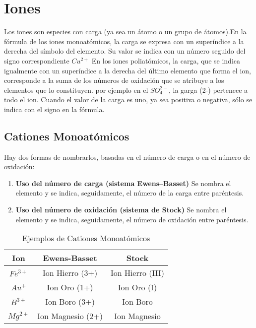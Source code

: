 \section{Iones}
Los iones son especies con carga (ya sea un átomo o un grupo de átomos).En la fórmula de los iones monoatómicos, la carga se expresa con un superíndice a la derecha del símbolo del elemento. Su valor se indica con un número seguido del signo correspondiente $Cu^{2+}$ En los iones poliatómicos, la carga, que se indica igualmente con un superíndice a la derecha del último elemento que forma el ion, corresponde a la suma de los números de oxidación que se atribuye a los elementos que lo constituyen. por ejemplo en el $SO_{4}^{2-}$, la garga (2-) pertenece a todo el ion. Cuando el valor de la carga es uno, ya sea positiva o negativa, sólo se indica con el signo en la fórmula.

\subsection{Cationes Monoatómicos}
Hay dos formas de nombrarlos, basadas en el número de carga o en el número de oxidación:\\
\begin{enumerate}
	
	\item \textbf{Uso del número de carga (sistema Ewens–Basset)} Se nombra el elemento y se indica, seguidamente, el número de la carga entre paréntesis.
	
	\item \textbf{Uso del número de oxidación (sistema de Stock)} Se nombra el elemento y se indica, seguidamente, el número de oxidación entre paréntesis.

\end{enumerate}

\begin{table}[h!]
	\centering\begin{tabular}{c|cc}
		Ion&Ewens-Basset&Stock \\ \hline 
		$Fe^{3+}$&Ion Hierro (3+)&Ion Hierro (III)\\
		$Au^{+}$&Ion Oro (1+)&Ion Oro (I)\\
		$B^{3+}$&Ion Boro (3+)&Ion Boro\\
		$Mg^{2+}$&Ion Magnesio (2+)&Ion Magnesio \\ \hline
	\end{tabular}
	\caption{Ejemplos de Cationes Monoatómicos}
\end{table}
